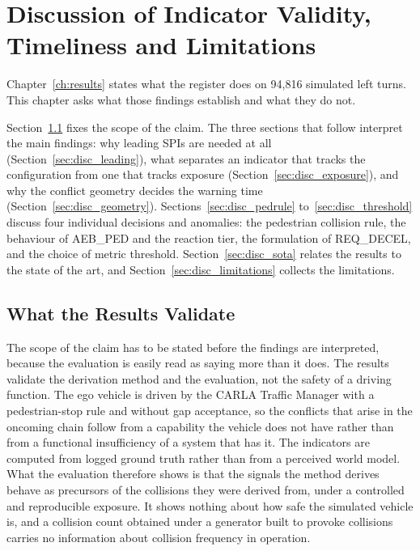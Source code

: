 \chapter[Discussion]{Discussion of Indicator Validity, Timeliness and Limitations}
\label{ch:discussion}

Chapter~\ref{ch:results} states what the register does on 94,816 simulated left
turns. This chapter asks what those findings establish and what they do not.

Section~\ref{sec:disc_scope} fixes the scope of the claim. The three sections
that follow interpret the main findings: why leading SPIs are needed at all
(Section~\ref{sec:disc_leading}), what separates an indicator that tracks the
configuration from one that tracks exposure (Section~\ref{sec:disc_exposure}),
and why the conflict geometry decides the warning time
(Section~\ref{sec:disc_geometry}). Sections~\ref{sec:disc_pedrule}
to~\ref{sec:disc_threshold} discuss four individual decisions and anomalies: the
pedestrian collision rule, the behaviour of AEB\_PED and the reaction tier, the
formulation of REQ\_DECEL, and the choice of metric threshold.
Section~\ref{sec:disc_sota} relates the results to the state of the art, and
Section~\ref{sec:disc_limitations} collects the limitations.

\section{What the Results Validate}
\label{sec:disc_scope}

The scope of the claim has to be stated before the findings are interpreted,
because the evaluation is easily read as saying more than it does. The results validate the derivation method and the evaluation, not the safety of
a driving function. The ego vehicle is driven by the CARLA Traffic Manager with a
pedestrian-stop rule and without gap acceptance, so the conflicts that arise in
the oncoming chain follow from a capability the vehicle does not have rather than
from a functional insufficiency of a system that has it. The indicators are
computed from logged ground truth rather than from a perceived world model. What
the evaluation therefore shows is that the signals the method derives behave as
precursors of the collisions they were derived from, under a controlled and
reproducible exposure. It shows nothing about how safe the simulated vehicle is,
and a collision count obtained under a generator built to provoke collisions
carries no information about collision frequency in operation.

